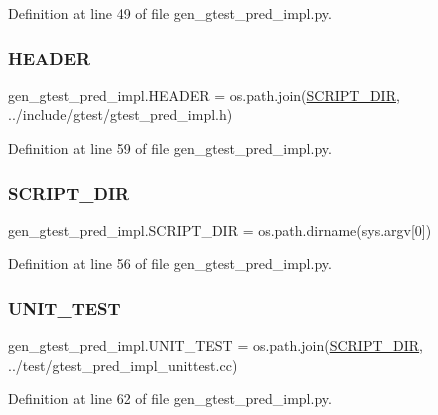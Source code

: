 Definition at line 49 of file gen\+\_\+gtest\+\_\+pred\+\_\+impl.\+py.

\mbox{\label{namespacegen__gtest__pred__impl_ab96c63705e2cb7619876ba592dab4c8e}} 
\subsubsection{\texorpdfstring{H\+E\+A\+D\+ER}{HEADER}}
{\footnotesize\ttfamily gen\+\_\+gtest\+\_\+pred\+\_\+impl.\+H\+E\+A\+D\+ER = os.\+path.\+join(\hyperlink{namespacegen__gtest__pred__impl_aed087c7fc787a064f0a9fd5f5f9f6487}{S\+C\+R\+I\+P\+T\+\_\+\+D\+IR}, \textquotesingle{}../include/gtest/gtest\+\_\+pred\+\_\+impl.\+h\textquotesingle{})}



Definition at line 59 of file gen\+\_\+gtest\+\_\+pred\+\_\+impl.\+py.

\mbox{\label{namespacegen__gtest__pred__impl_aed087c7fc787a064f0a9fd5f5f9f6487}} 
\subsubsection{\texorpdfstring{S\+C\+R\+I\+P\+T\+\_\+\+D\+IR}{SCRIPT\_DIR}}
{\footnotesize\ttfamily gen\+\_\+gtest\+\_\+pred\+\_\+impl.\+S\+C\+R\+I\+P\+T\+\_\+\+D\+IR = os.\+path.\+dirname(sys.\+argv\mbox{[}0\mbox{]})}



Definition at line 56 of file gen\+\_\+gtest\+\_\+pred\+\_\+impl.\+py.

\mbox{\label{namespacegen__gtest__pred__impl_a8c1cb8e87c4bd84edbb958f73b7df200}} 
\subsubsection{\texorpdfstring{U\+N\+I\+T\+\_\+\+T\+E\+ST}{UNIT\_TEST}}
{\footnotesize\ttfamily gen\+\_\+gtest\+\_\+pred\+\_\+impl.\+U\+N\+I\+T\+\_\+\+T\+E\+ST = os.\+path.\+join(\hyperlink{namespacegen__gtest__pred__impl_aed087c7fc787a064f0a9fd5f5f9f6487}{S\+C\+R\+I\+P\+T\+\_\+\+D\+IR}, \textquotesingle{}../test/gtest\+\_\+pred\+\_\+impl\+\_\+unittest.\+cc\textquotesingle{})}



Definition at line 62 of file gen\+\_\+gtest\+\_\+pred\+\_\+impl.\+py.

